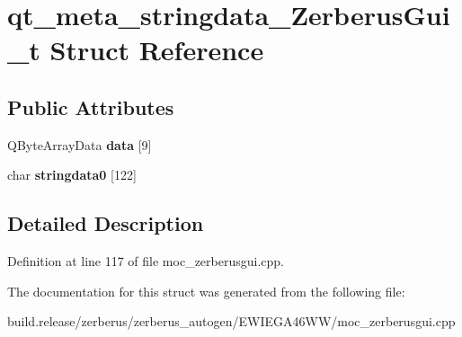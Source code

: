 \hypertarget{structqt__meta__stringdata___zerberus_gui__t}{}\section{qt\+\_\+meta\+\_\+stringdata\+\_\+\+Zerberus\+Gui\+\_\+t Struct Reference}
\label{structqt__meta__stringdata___zerberus_gui__t}
\subsection*{Public Attributes}
\begin{DoxyCompactItemize}
\item 
\mbox{\label{structqt__meta__stringdata___zerberus_gui__t_a6fb62d6f261c1b93cc993afa0f3712a3}} 
Q\+Byte\+Array\+Data {\bfseries data} \mbox{[}9\mbox{]}
\item 
\mbox{\label{structqt__meta__stringdata___zerberus_gui__t_acac069b9d29e2840c87c042612f2770f}} 
char {\bfseries stringdata0} \mbox{[}122\mbox{]}
\end{DoxyCompactItemize}


\subsection{Detailed Description}


Definition at line 117 of file moc\+\_\+zerberusgui.\+cpp.



The documentation for this struct was generated from the following file\+:\begin{DoxyCompactItemize}
\item 
build.\+release/zerberus/zerberus\+\_\+autogen/\+E\+W\+I\+E\+G\+A46\+W\+W/moc\+\_\+zerberusgui.\+cpp\end{DoxyCompactItemize}
